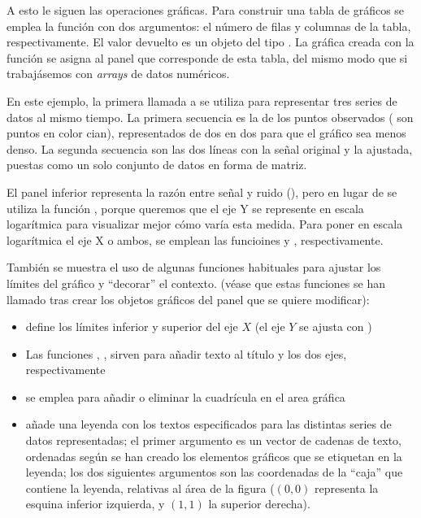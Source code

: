 A esto le siguen las operaciones gráficas. Para construir una tabla de gráficos se emplea la función  con dos argumentos: el número de filas y columnas de la tabla, respectivamente. El valor devuelto es un objeto del tipo . La gráfica creada con la función  se asigna al panel que corresponde de esta tabla, del mismo modo que si trabajásemos con \emph{arrays} de datos numéricos.

En este ejemplo, la primera llamada a  se utiliza para representar tres series de datos al mismo tiempo. La primera secuencia es la de los puntos observados ( son puntos en color cian), representados de dos en dos para que el gráfico sea menos denso. La segunda secuencia son las dos líneas con la señal original y la ajustada, puestas como un solo conjunto de datos en forma de matriz.

El panel inferior representa la razón entre señal y ruido (), pero en lugar de  se utiliza la función , porque queremos que el eje Y se represente en escala logarítmica para visualizar mejor cómo varía esta medida. Para poner en escala logarítmica el eje X o ambos, se emplean las funcioines  y , respectivamente.

También se muestra el uso de algunas funciones habituales para ajustar los límites del gráfico y ``decorar'' el contexto. (véase que estas funciones se han llamado tras crear los objetos gráficos del panel que se quiere modificar):

\begin{itemize}
  \item {} define los límites inferior y superior del eje $X$ (el eje $Y$ se ajusta con )
  \item Las funciones , ,  sirven para añadir texto al título y los dos ejes, respectivamente
  \item {} se emplea para añadir o eliminar la cuadrícula en el area gráfica
  \item {} añade una leyenda con los textos especificados para las distintas series de datos representadas; el primer argumento es un vector de cadenas de texto, ordenadas según se han creado los elementos gráficos que se etiquetan en la leyenda; los dos siguientes argumentos son las coordenadas de la ``caja'' que contiene la leyenda, relativas al área de la figura ($(0,0)$ representa la esquina inferior izquierda, y $(1,1)$ la superior derecha).
\end{itemize}

